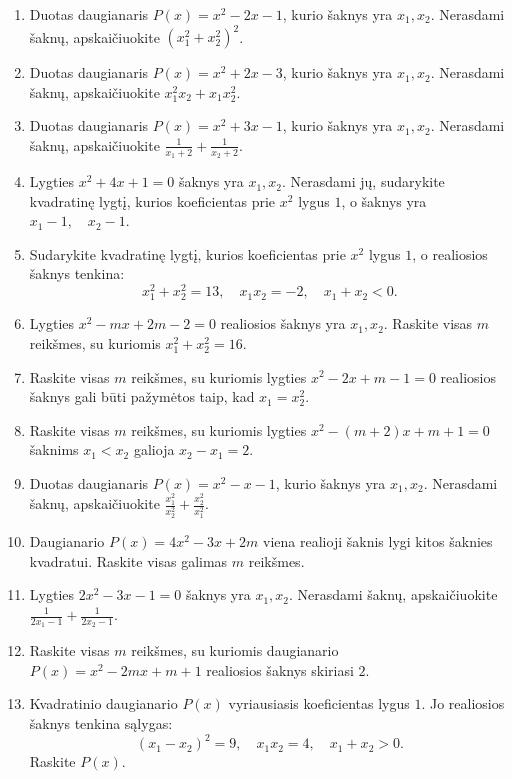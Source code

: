 \documentclass[11pt,a4paper]{article}
\begin{document}
\begin{enumerate}
\item Duotas daugianaris \(P(x)=x^2-2x-1\), kurio šaknys yra \(x_1,x_2\). Nerasdami šaknų, apskaičiuokite \mbox{\((x_1^2+x_2^2)^2\)}.
\item Duotas daugianaris \(P(x)=x^2+2x-3\), kurio šaknys yra \(x_1,x_2\). Nerasdami šaknų, apskaičiuokite \mbox{\(x_1^2x_2+x_1x_2^2\)}.
\item Duotas daugianaris \(P(x)=x^2+3x-1\), kurio šaknys yra \(x_1,x_2\). Nerasdami šaknų, apskaičiuokite \mbox{\(\frac1{x_1+2}+\frac1{x_2+2}\)}.
\item Lygties \(x^2+4x+1=0\) šaknys yra \(x_1,x_2\). Nerasdami jų, sudarykite kvadratinę lygtį, kurios koeficientas prie \(x^2\) lygus \(1\), o šaknys yra \mbox{\(x_1-1,\quad x_2-1\)}.
\item \begin{minipage}[t]{\linewidth}Sudarykite kvadratinę lygtį, kurios koeficientas prie \(x^2\) lygus \(1\), o realiosios šaknys tenkina: \[x_1^2+x_2^2=13,\quad x_1x_2=-2,\quad x_1+x_2<0.\]\end{minipage}
\item Lygties \(x^2-mx+2m-2=0\) realiosios šaknys yra \(x_1,x_2\). Raskite visas \(m\) reikšmes, su kuriomis \mbox{\(x_1^2+x_2^2=16\)}.
\item Raskite visas \(m\) reikšmes, su kuriomis lygties \(x^2-2x+m-1=0\) realiosios šaknys gali būti pažymėtos taip, kad \mbox{\(x_1=x_2^2\)}.
\item Raskite visas \(m\) reikšmes, su kuriomis lygties \(x^2-(m+2)x+m+1=0\) šaknims \(x_1<x_2\) galioja \mbox{\(x_2-x_1=2\)}.
\item Duotas daugianaris \(P(x)=x^2-x-1\), kurio šaknys yra \(x_1,x_2\). Nerasdami šaknų, apskaičiuokite \mbox{\(\frac{x_1^2}{x_2^2}+\frac{x_2^2}{x_1^2}\)}.
\item Daugianario \(P(x)=4x^2-3x+2m\) viena realioji šaknis lygi kitos šaknies kvadratui. Raskite visas galimas \(m\) reikšmes.
\item Lygties \(2x^2-3x-1=0\) šaknys yra \(x_1,x_2\). Nerasdami šaknų, apskaičiuokite \mbox{\(\frac1{2x_1-1}+\frac1{2x_2-1}\)}.
\item Raskite visas \(m\) reikšmes, su kuriomis daugianario \(P(x)=x^2-2mx+m+1\) realiosios šaknys skiriasi \(2\).
\item \begin{minipage}[t]{\linewidth}Kvadratinio daugianario \(P(x)\) vyriausiasis koeficientas lygus \(1\). Jo realiosios šaknys tenkina sąlygas: \[(x_1-x_2)^2=9,\quad x_1x_2=4,\quad x_1+x_2>0.\] Raskite \(P(x)\).\end{minipage}

\end{enumerate}
\end{document}
